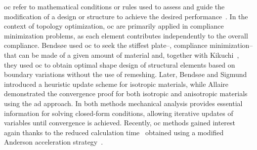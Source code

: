 \gls{oc} refer to mathematical conditions or rules used to assess and guide the modification of a design or structure to achieve the desired performance~. In the context of topology optimization, \gls{oc} are primarily applied in compliance minimization problems, as each element contributes independently to the overall compliance. Bendsøe used \gls{oc} to seek the stiffest plate--\ie, compliance minimization--that can be made of a given amount of material and, together with Kikuchi~, they used \gls{oc} to obtain optimal shape design of structural elements based on boundary variations without the use of remeshing. Later, Bendsøe and Sigmund~ introduced a heuristic update scheme for isotropic materials, while Allaire \etal~ demonstrated the convergence proof for both isotropic and anisotropic materials using the \gls{ad} approach. In both methods mechanical analysis provides essential information for solving closed-form conditions, allowing iterative updates of variables until convergence is achieved. Recently, \gls{oc} methods gained interest again thanks to the reduced calculation time~ obtained using a modified Anderson acceleration strategy~.

